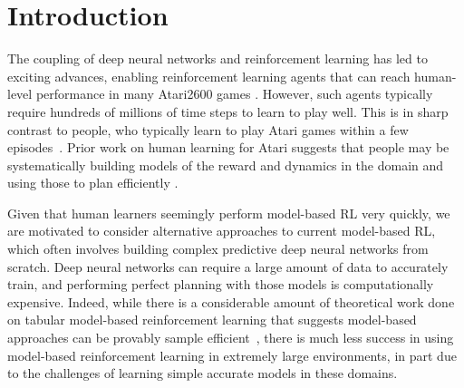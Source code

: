 \section{Introduction}
The coupling of deep neural networks and reinforcement learning has led to exciting advances, enabling reinforcement learning agents that can reach human-level performance in many Atari2600 games \citep{mnih2015human, mnih2016asynchronous, silver2017mastering, hessel2017rainbow}.
However, such agents typically require hundreds of millions of time steps to learn to play well. This is in sharp contrast to people, who typically learn to play Atari games within a few episodes~\citep{lake2017building}. Prior work on human learning for Atari suggests that people may be systematically building models of the reward and dynamics in the domain and using those to plan efficiently \citep{tsividis2017human, dubey2018investigating}. 


Given that human learners seemingly perform model-based RL very quickly, we are motivated to consider alternative approaches to current model-based RL, which often involves building complex predictive deep neural networks from scratch. Deep neural networks can require a large amount of data to accurately train, and performing perfect planning with those models is computationally expensive. Indeed, while there is a considerable amount of theoretical work done on tabular model-based reinforcement learning that suggests model-based approaches can be provably sample efficient~\citep{dann2017unifying, brafman2002r, strehl2008analysis}, there is much less success in using model-based reinforcement learning in extremely large environments, in part due to the challenges of learning simple accurate models in these domains. 

